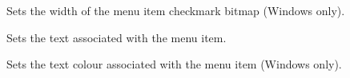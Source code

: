 
Sets the width of the menu item checkmark bitmap (Windows only).

\label{wxmenuitemsetname}


Sets the text associated with the menu item.

\label{wxmenuitemsettextcolour}


Sets the text colour associated with the menu item (Windows only).



